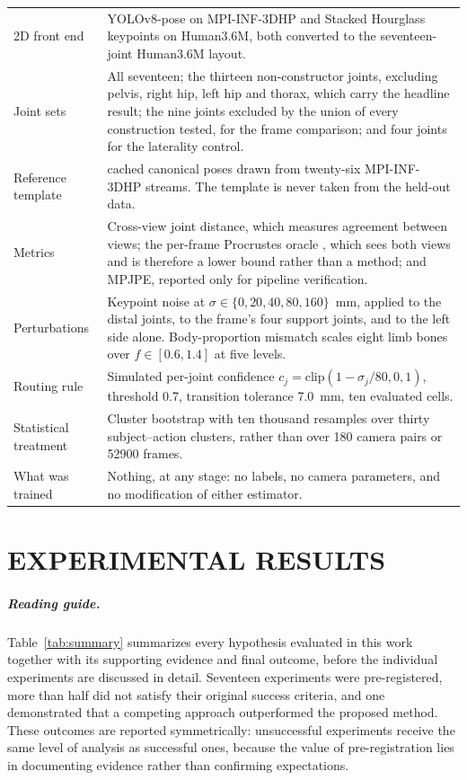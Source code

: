 \documentclass[12pt,a4paper]{report}
\begin{document}
{\begin{longtable}{>{\raggedright\arraybackslash}p{3.4cm}>{\raggedright\arraybackslash}p{11.4cm}}
2D front end & YOLOv8-pose \cite{yolov8} on MPI-INF-3DHP and Stacked Hourglass keypoints \cite{hourglass} on Human3.6M, both converted to the seventeen-joint Human3.6M layout. \\
Joint sets & All seventeen; the thirteen non-constructor joints, excluding pelvis, right hip, left hip and thorax, which carry the headline result; the nine joints excluded by the union of every construction tested, for the frame comparison; and four joints for the laterality control. \\
Reference template & 2460 cached canonical poses drawn from twenty-six MPI-INF-3DHP streams. The template is never taken from the held-out data. \\
Metrics & Cross-view joint distance, which measures agreement between views; the per-frame Procrustes oracle \cite{kabsch}, which sees both views and is therefore a lower bound rather than a method; and MPJPE, reported only for pipeline verification. \\
Perturbations & Keypoint noise at $\sigma \in \{0, 20, 40, 80, 160\}$~mm, applied to the distal joints, to the frame's four support joints, and to the left side alone. Body-proportion mismatch scales eight limb bones over $f \in [0.6, 1.4]$ at five levels. \\
Routing rule & Simulated per-joint confidence $c_j = \mathrm{clip}(1 - \sigma_j/80, 0, 1)$, threshold 0.7, transition tolerance 7.0~mm, ten evaluated cells. \\
Statistical treatment & Cluster bootstrap with ten thousand resamples over thirty subject--action clusters, rather than over 180 camera pairs or 52900 frames. \\
What was trained & Nothing, at any stage: no labels, no camera parameters, and no modification of either estimator. \\
\hline
\end{longtable}}

\chapter{EXPERIMENTAL RESULTS}
\label{ch:results}

\paragraph{Reading guide.} Table~\ref{tab:summary} summarizes every hypothesis
evaluated in this work together with its supporting evidence and final outcome,
before the individual experiments are discussed in detail. Seventeen experiments
were pre-registered, more than half did not satisfy their original success
criteria, and one demonstrated that a competing approach outperformed the
proposed method. These outcomes are reported symmetrically: unsuccessful
experiments receive the same level of analysis as successful ones, because the
value of pre-registration lies in documenting evidence rather than confirming
expectations.
\end{document}
